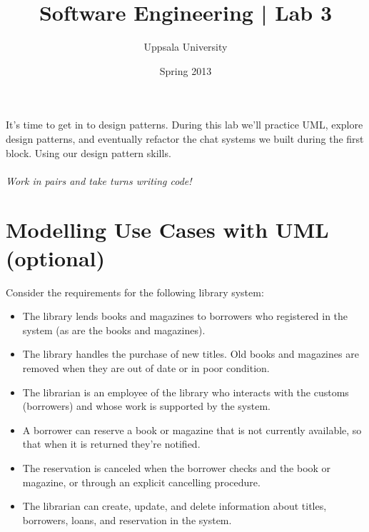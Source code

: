 \documentclass{article}
\begin{document}
  \title{ Software Engineering | Lab 3 }
  \author{ Uppsala University }
  \date{ Spring 2013 }
  \maketitle

  \lstset{language=[Sharp]C}

  \section*{}
    It's time to get in to design patterns. During this lab we'll practice UML, explore design patterns, and eventually refactor the chat systems we built during the first block. Using our design pattern skills.\\\\\emph{Work in pairs and take turns writing code!}

  \tableofcontents





\pagebreak
  \section{Modelling Use Cases with UML (optional)}

  Consider the requirements for the following library system:

  \begin{itemize}
  \item The library lends books and magazines to borrowers who registered in the system (as are the books and magazines).
  \item The library handles the purchase of new titles. Old books and magazines are removed when they are out of date or in poor condition.
  \item The librarian is an employee of the library who interacts with the customs (borrowers) and whose work is supported by the system.
  \item A borrower can reserve a book or magazine that is not currently available, so that when it is returned they're notified.
  \item The reservation is canceled when the borrower checks and the book or magazine, or through an explicit cancelling procedure.
  \item The librarian can create, update, and delete information about titles, borrowers, loans, and reservation in the system.
  \end{itemize}
\end{document}
